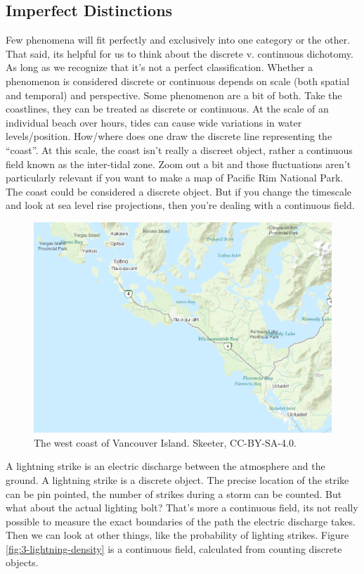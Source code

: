 \documentclass[
]{book}
\begin{document}
\subsection{Imperfect Distinctions}\label{imperfect-distinctions}

Few phenomena will fit perfectly and exclusively into one category or the other. That said, its helpful for us to think about the discrete v. continuous dichotomy. As long as we recognize that it's not a perfect classification. Whether a phenomenon is considered discrete or continuous depends on scale (both spatial and temporal) and perspective. Some phenomenon are a bit of both. Take the coastlines, they can be treated as discrete or continuous. At the scale of an individual beach over hours, tides can cause wide variations in water levels/position. How/where does one draw the discrete line representing the ``coast''. At this scale, the coast isn't really a discreet object, rather a continuous field known as the inter-tidal zone. Zoom out a bit and those fluctuations aren't particularly relevant if you want to make a map of Pacific Rim National Park. The coast could be considered a discrete object. But if you change the timescale and look at sea level rise projections, then you're dealing with a continuous field.

\begin{figure}
\includegraphics[width=0.75\linewidth]{images/03-beach-small-scale} \caption{The west coast of Vancouver Island. Skeeter, CC-BY-SA-4.0.}\label{fig:3-beach-small-scale}
\end{figure}

A lightning strike is an electric discharge between the atmosphere and the ground. A lightning strike is a discrete object. The precise location of the strike can be pin pointed, the number of strikes during a storm can be counted. But what about the actual lighting bolt? That's more a continuous field, its not really possible to measure the exact boundaries of the path the electric discharge takes. Then we can look at other things, like the probability of lighting strikes. Figure \ref{fig:3-lightning-density} is a continuous field, calculated from counting discrete objects.
\end{document}
